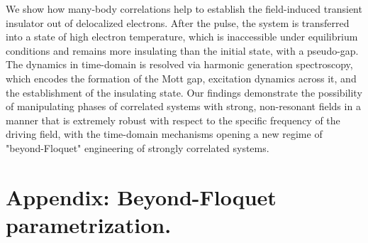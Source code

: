 We show how many-body correlations help to establish the field-induced transient insulator out of delocalized electrons. After the pulse, the system is transferred into a state of high electron temperature, which is inaccessible under equilibrium conditions and remains more insulating than the initial state, with a pseudo-gap. 
The dynamics in time-domain is 
resolved via harmonic generation spectroscopy, which 
encodes the formation of the Mott gap, 
excitation dynamics across it, and the establishment 
of the insulating state. 
Our findings demonstrate the possibility of manipulating phases 
of correlated systems with strong, non-resonant  
fields in a manner that is extremely robust with respect to the specific
frequency of the driving field, with the time-domain 
mechanisms opening a new regime of "beyond-Floquet" engineering of 
strongly correlated systems.

\FloatBarrier
\section{\label{beyond_Floquet}Appendix: Beyond-Floquet parametrization.}

